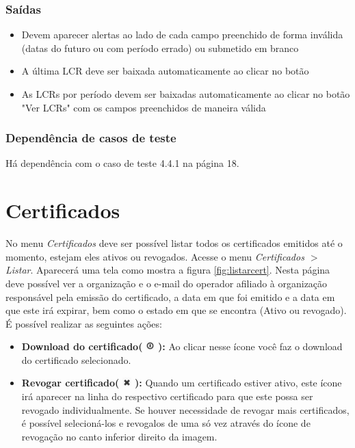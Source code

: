 \subsubsection{Saídas}

\begin{itemize}

	\item Devem aparecer alertas ao lado de cada campo preenchido de forma inválida (datas do futuro ou com período errado) ou submetido em branco
    \item A última LCR deve ser baixada automaticamente ao clicar no botão
    \item As LCRs por período devem ser baixadas automaticamente ao clicar no botão "Ver LCRs" com os campos preenchidos de maneira válida
	
\end{itemize}

\subsubsection{Dependência de casos de teste}
Há dependência com o caso de teste 4.4.1 na página 18.

\section{Certificados}

No menu \textit{Certificados} deve ser possível listar todos os certificados emitidos até o momento, estejam eles ativos ou revogados. Acesse o menu \textit{Certificados $>$ Listar}. Aparecerá uma tela como mostra a figura \ref{fig:listarcert}. Nesta página deve possível ver a organização e o e-mail do operador afiliado à organização responsável pela emissão do certificado, a data em que foi emitido e a data em que este irá expirar, bem como o estado em que se encontra (Ativo ou revogado). É possível realizar as seguintes ações:

\begin{itemize}

	\item \textbf{Download do certificado(} \includegraphics[height=10pt]{images/iconedownload} \textbf{):} Ao clicar nesse ícone você faz o download do certificado selecionado.
	\item \textbf{Revogar certificado(} \includegraphics[height=10pt]{images/iconedelete2} \textbf{):} Quando um certificado estiver ativo, este ícone irá aparecer na linha do respectivo certificado para que este possa ser revogado individualmente. Se houver necessidade de revogar mais certificados, é possível selecioná-los e revogalos de uma só vez através do ícone de revogação no canto inferior direito da imagem. 
	
\end{itemize}

